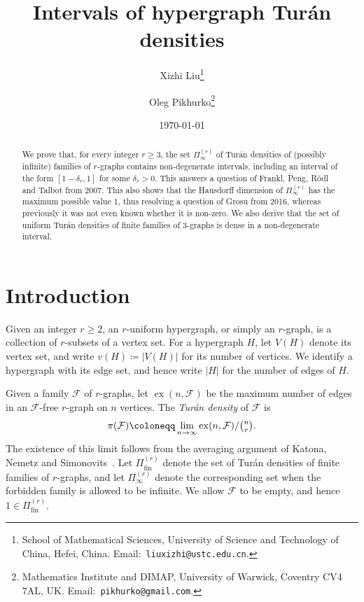 \documentclass[10pt]{article}
\title{\Large\bf Intervals of hypergraph Tur\'an densities}
\author{%
Xizhi Liu\thanks{\scriptsize School of Mathematical Sciences, University of Science and Technology of China, Hefei, China.
Email:~\texttt{liuxizhi@ustc.edu.cn}.}
\and
Oleg Pikhurko\thanks{\scriptsize Mathematics Institute and DIMAP, University of Warwick, Coventry CV4 7AL, UK.
Email:~\texttt{pikhurko@gmail.com}.}}
\date{\today}
\newcommand{\hide}[1]{}
\numberwithin{equation}{section}
\DeclareMathOperator{\ex}{ex}
\newcommand{\vvv}{\mathord{\scaleobj{1.2}{\scalerel*{\usebox{\vvvbox}}{x}}}}
\newcommand{\fin}{\mathrm{fin}}
\begin{document}
\maketitle

\begin{abstract}
    We prove that, for every integer $r\ge 3$, the set $\Pi^{(r)}_\infty$ of Tur\'an densities of (possibly infinite) families of $r$-graphs contains non-degenerate intervals, including an interval of the form $[1-\delta_r,1]$ for some $\delta_{r}>0$. This answers a question of Frankl, Peng, R\"odl and Talbot from 2007. This also shows that the Hausdorff dimension of $\Pi^{(r)}_\infty$ has the maximum possible value 1, thus resolving a question of Grosu from 2016, whereas previously it was not even known whether it is non-zero.
We also derive that the set 
of uniform Tur\'an densities of finite families of $3$-graphs is dense in a non-degenerate interval. 

\hide{    
The proof starts with a sequence of $3$-graphs $P_i$ whose Lagrangians converge slowly from above to a point $\alpha$, using 
the Ramanujan Cayley graphs constructed by Lubotzky--Phillips--Sarnak. We then incorporate this slowly convergent sequence into a suitable recursive construction, so that infinite subsequences can be used to approximate any prescribed real number in an interval.}
\end{abstract}
\section{Introduction}

Given an integer $r\ge 2$, an $r$-uniform hypergraph, or simply an $r$-graph, is a collection of $r$-subsets of a vertex set.  For a hypergraph $H$, let $V(H)$ denote its vertex set, and write $v(H)\coloneqq |V(H)|$ for its number of vertices. We identify a hypergraph with its edge set, and hence write $|H|$ for the number of edges of $H$.

Given a family $\mathcal F$ of $r$-graphs, let $\ex(n,\mathcal F)$ be the maximum number of edges in an $\mathcal F$-free $r$-graph on $n$ vertices. The \emph{Tur\'an density} of $\mathcal F$ is
\[
        \pi(\mathcal F) \coloneqq \lim_{n\to\infty}{\ex(n,\mathcal F)}/{\tbinom nr}.
\]
The existence of this limit follows from the averaging argument of Katona, Nemetz and Simonovits~\cite{KatonaNemetzSimonovits1964}. Let $\Pi^{(r)}_{\fin}$ denote the set of Tur\'an densities of finite families of $r$-graphs, and let $\Pi^{(r)}_\infty$ denote the corresponding set when the forbidden family is allowed to be infinite. We allow $\mathcal F$ to be empty, and hence $1\in \Pi^{(r)}_{\fin}$.
\end{document}
